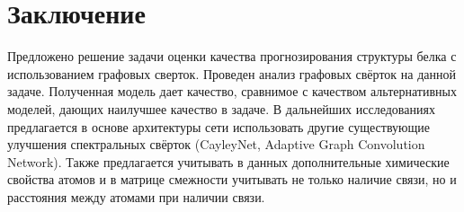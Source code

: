 \documentclass[14pt]{extarticle}
\begin{document}
\section{Заключение}
Предложено решение задачи оценки качества прогнозирования структуры белка с использованием графовых сверток. Проведен анализ графовых свёрток на данной задаче. Полученная модель дает качество, сравнимое с качеством альтернативных моделей, дающих наилучшее качество в задаче. В дальнейших исследованиях предлагается в основе архитектуры сети использовать другие существующие улучшения спектральных свёрток (CayleyNet, Adaptive Graph Convolution Network). Также предлагается учитывать в данных дополнительные химические свойства атомов и в матрице смежности учитывать не только наличие связи, но и расстояния между атомами при наличии связи.

\newpage

\newpage
{}


\nocite{*}
\end{document}
